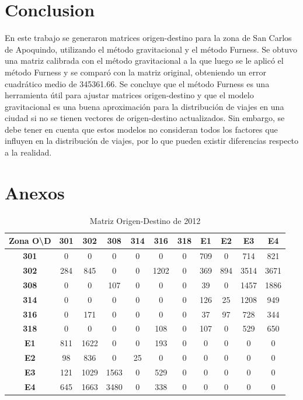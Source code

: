\documentclass[letterpaper,12pt]{article}
\begin{document}
\section{Conclusion}

En este trabajo se generaron matrices origen-destino para la zona de San Carlos de Apoquindo, utilizando el método gravitacional y el método Furness. Se obtuvo una matriz calibrada con el método gravitacional a la que luego se le aplicó el método Furness y se comparó con la matriz original, obteniendo un error cuadrático medio de 345361.66. Se concluye que el método Furness es una herramienta útil para ajustar matrices origen-destino y que el modelo gravitacional es una buena aproximación para la distribución de viajes en una ciudad si no se tienen vectores de origen-destino actualizados. Sin embargo, se debe tener en cuenta que estos modelos no consideran todos los factores que influyen en la distribución de viajes, por lo que pueden existir diferencias respecto a la realidad.

\newpage
\section{Anexos}
\begin{table}[h!]
    \centering
    \begin{tabular}{c|cccccccccc}    
    \textbf{Zona O\textbackslash D} & \textbf{301} & \textbf{302} & \textbf{308} & \textbf{314} & \textbf{316} & \textbf{318} & \textbf{E1} & \textbf{E2} & \textbf{E3} & \textbf{E4} \\ \hline
    \textbf{301} & 0 & 0 & 0 & 0 & 0 & 0 & 709 & 0 & 714 & 821 \\ 
    \textbf{302} & 284 & 845 & 0 & 0 & 1202 & 0 & 369 & 894 & 3514 & 3671 \\ 
    \textbf{308} & 0 & 0 & 107 & 0 & 0 & 0 & 39 & 0 & 1457 & 1886 \\ 
    \textbf{314} & 0 & 0 & 0 & 0 & 0 & 0 & 126 & 25 & 1208 & 949 \\ 
    \textbf{316} & 0 & 171 & 0 & 0 & 0 & 0 & 37 & 97 & 728 & 344 \\ 
    \textbf{318} & 0 & 0 & 0 & 0 & 108 & 0 & 107 & 0 & 529 & 650 \\ 
    \textbf{E1} & 811 & 1622 & 0 & 0 & 193 & 0 & 0 & 0 & 0 & 0 \\ 
    \textbf{E2} & 98 & 836 & 0 & 25 & 0 & 0 & 0 & 0 & 0 & 0 \\ 
    \textbf{E3} & 121 & 1029 & 1563 & 0 & 529 & 0 & 0 & 0 & 0 & 0 \\ 
    \textbf{E4} & 645 & 1663 & 3480 & 0 & 338 & 0 & 0 & 0 & 0 & 0 \\ 
    \end{tabular}
    \caption{Matriz Origen-Destino de 2012}
    \label{table:data_matrix}
\end{table}
\end{document}
